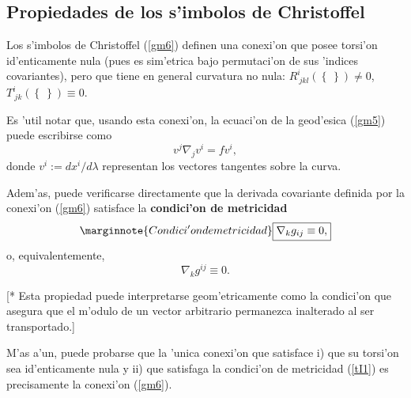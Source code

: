 \subsection{Propiedades de los s'imbolos de Christoffel}

Los s'imbolos de Christoffel (\ref{gm6}) definen una conexi'on que posee torsi'on id'enticamente nula (pues es sim'etrica bajo permutaci'on de sus 'indices covariantes), pero que tiene en general curvatura no nula: $R^i_{\ jkl}(\left\{_{ \ }^{\ }\right\})\neq 0$, $T^i_{\ jk}(\left\{_{ \ }^{\ }\right\})\equiv 0$.

Es 'util notar que, usando esta conexi'on, la ecuaci'on de la geod'esica (\ref{gm5}) puede escribirse
como
\begin{equation}
 v^j\nabla_jv^i=fv^i, \label{egdc}
\end{equation}
donde $v^i:={dx^i}/{d\lambda}$ representan los vectores tangentes sobre la
curva.

Adem'as, puede verificarse directamente que la derivada covariante definida por
la conexi'on (\ref{gm6}) satisface la \textbf{condici'on de metricidad}
\begin{equation}\marginnote{Condici'on de metricidad}
\boxed{\nabla_kg_{ij}\equiv 0,} \label{tI1}%
\end{equation}
o, equivalentemente,
\begin{equation}
\nabla_kg^{ij}\equiv 0. \label{tIi2}%
\end{equation}

[* Esta propiedad puede interpretarse geom'etricamente como la condici'on que
asegura que el m'odulo de un vector arbitrario permanezca inalterado al ser
transportado.]

M'as a'un, puede probarse que la 'unica conexi'on que satisface i) que su
torsi'on sea id'enticamente nula y ii) que satisfaga la condici'on de metricidad
(\ref{tI1}) es precisamente la conexi'on (\ref{gm6}).

